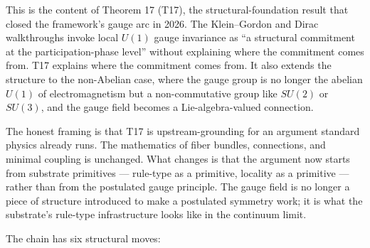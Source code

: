 \documentclass[11pt,a4paper]{article}
\begin{document}
This is the content of Theorem 17 (T17), the structural-foundation result that closed the framework's gauge arc in 2026. The Klein--Gordon and Dirac walkthroughs invoke local $U(1)$ gauge invariance as ``a structural commitment at the participation-phase level'' without explaining where the commitment comes from. T17 explains where the commitment comes from. It also extends the structure to the non-Abelian case, where the gauge group is no longer the abelian $U(1)$ of electromagnetism but a non-commutative group like $SU(2)$ or $SU(3)$, and the gauge field becomes a Lie-algebra-valued connection.

The honest framing is that T17 is upstream-grounding for an argument standard physics already runs. The mathematics of fiber bundles, connections, and minimal coupling is unchanged. What changes is that the argument now starts from substrate primitives --- rule-type as a primitive, locality as a primitive --- rather than from the postulated gauge principle. The gauge field is no longer a piece of structure introduced to make a postulated symmetry work; it is what the substrate's rule-type infrastructure looks like in the continuum limit.

The chain has six structural moves:
\end{document}
